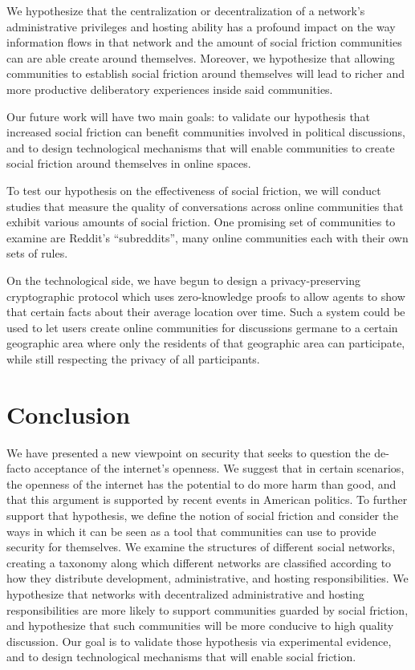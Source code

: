 \documentclass[sigconf,authordraft]{acmart}
\begin{document}
We hypothesize that the centralization or decentralization of a network's administrative privileges and hosting ability has a profound impact on the way information flows in that network and the amount of social friction communities can are able create around themselves. Moreover, we hypothesize that allowing communities to establish social friction around themselves will lead to richer and more productive deliberatory experiences inside said communities.

Our future work will have two main goals: to validate our hypothesis that increased social friction can benefit communities involved in political discussions, and to design technological mechanisms that will enable communities to create social friction around themselves in online spaces. 

To test our hypothesis on the effectiveness of social friction, we will conduct studies that measure the quality of conversations across online communities that exhibit various amounts of social friction. One promising set of communities to examine are Reddit's ``subreddits'', many online communities each with their own sets of rules.

On the technological side, we have begun to design a privacy-preserving cryptographic protocol which uses zero-knowledge proofs \cite{goldreich1991proofs} to allow agents to show that certain facts about their average location over time. Such a system could be used to let users create online communities for discussions germane to a certain geographic area where only the residents of that geographic area can participate, while still respecting the privacy of all participants.

\section{Conclusion}

We have presented a new viewpoint on security that seeks to question the de-facto acceptance of the internet's openness. We suggest that in certain scenarios, the openness of the internet has the potential to do more harm than good, and that this argument is supported by recent events in American politics. To further support that hypothesis, we define the notion of social friction and consider the ways in which it can be seen as a tool that communities can use to provide security for themselves. We examine the structures of different social networks, creating a taxonomy along which different networks are classified according to how they distribute development, administrative, and hosting responsibilities. We hypothesize that networks with decentralized administrative and hosting responsibilities are more likely to support communities guarded by social friction, and hypothesize that such communities will be more conducive to high quality discussion. Our goal is to validate those hypothesis via experimental evidence, and to design technological mechanisms that will enable social friction.




\end{document}
